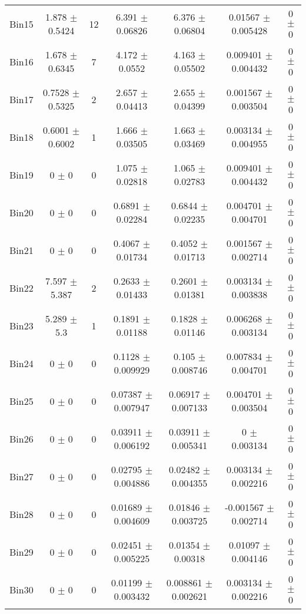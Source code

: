 \begin{tabular}{@{\extracolsep{4pt}}lcccccc@{}}
     Bin15 & 1.878 $\pm$ 0.5424 & 12 & 6.391 $\pm$ 0.06826 & 6.376 $\pm$ 0.06804 & 0.01567 $\pm$ 0.005428 & 0 $\pm$ 0 \\ 
     Bin16 & 1.678 $\pm$ 0.6345 & 7 & 4.172 $\pm$ 0.0552 & 4.163 $\pm$ 0.05502 & 0.009401 $\pm$ 0.004432 & 0 $\pm$ 0 \\ 
     Bin17 & 0.7528 $\pm$ 0.5325 & 2 & 2.657 $\pm$ 0.04413 & 2.655 $\pm$ 0.04399 & 0.001567 $\pm$ 0.003504 & 0 $\pm$ 0 \\ 
     Bin18 & 0.6001 $\pm$ 0.6002 & 1 & 1.666 $\pm$ 0.03505 & 1.663 $\pm$ 0.03469 & 0.003134 $\pm$ 0.004955 & 0 $\pm$ 0 \\ 
     Bin19 & 0 $\pm$ 0 & 0 & 1.075 $\pm$ 0.02818 & 1.065 $\pm$ 0.02783 & 0.009401 $\pm$ 0.004432 & 0 $\pm$ 0 \\ 
     Bin20 & 0 $\pm$ 0 & 0 & 0.6891 $\pm$ 0.02284 & 0.6844 $\pm$ 0.02235 & 0.004701 $\pm$ 0.004701 & 0 $\pm$ 0 \\ 
     Bin21 & 0 $\pm$ 0 & 0 & 0.4067 $\pm$ 0.01734 & 0.4052 $\pm$ 0.01713 & 0.001567 $\pm$ 0.002714 & 0 $\pm$ 0 \\ 
     Bin22 & 7.597 $\pm$ 5.387 & 2 & 0.2633 $\pm$ 0.01433 & 0.2601 $\pm$ 0.01381 & 0.003134 $\pm$ 0.003838 & 0 $\pm$ 0 \\ 
     Bin23 & 5.289 $\pm$ 5.3 & 1 & 0.1891 $\pm$ 0.01188 & 0.1828 $\pm$ 0.01146 & 0.006268 $\pm$ 0.003134 & 0 $\pm$ 0 \\ 
     Bin24 & 0 $\pm$ 0 & 0 & 0.1128 $\pm$ 0.009929 & 0.105 $\pm$ 0.008746 & 0.007834 $\pm$ 0.004701 & 0 $\pm$ 0 \\ 
     Bin25 & 0 $\pm$ 0 & 0 & 0.07387 $\pm$ 0.007947 & 0.06917 $\pm$ 0.007133 & 0.004701 $\pm$ 0.003504 & 0 $\pm$ 0 \\ 
     Bin26 & 0 $\pm$ 0 & 0 & 0.03911 $\pm$ 0.006192 & 0.03911 $\pm$ 0.005341 & 0 $\pm$ 0.003134 & 0 $\pm$ 0 \\ 
     Bin27 & 0 $\pm$ 0 & 0 & 0.02795 $\pm$ 0.004886 & 0.02482 $\pm$ 0.004355 & 0.003134 $\pm$ 0.002216 & 0 $\pm$ 0 \\ 
     Bin28 & 0 $\pm$ 0 & 0 & 0.01689 $\pm$ 0.004609 & 0.01846 $\pm$ 0.003725 & -0.001567 $\pm$ 0.002714 & 0 $\pm$ 0 \\ 
     Bin29 & 0 $\pm$ 0 & 0 & 0.02451 $\pm$ 0.005225 & 0.01354 $\pm$ 0.00318 & 0.01097 $\pm$ 0.004146 & 0 $\pm$ 0 \\ 
     Bin30 & 0 $\pm$ 0 & 0 & 0.01199 $\pm$ 0.003432 & 0.008861 $\pm$ 0.002621 & 0.003134 $\pm$ 0.002216 & 0 $\pm$ 0 \\ 
\hline\hline
  \end{tabular}
